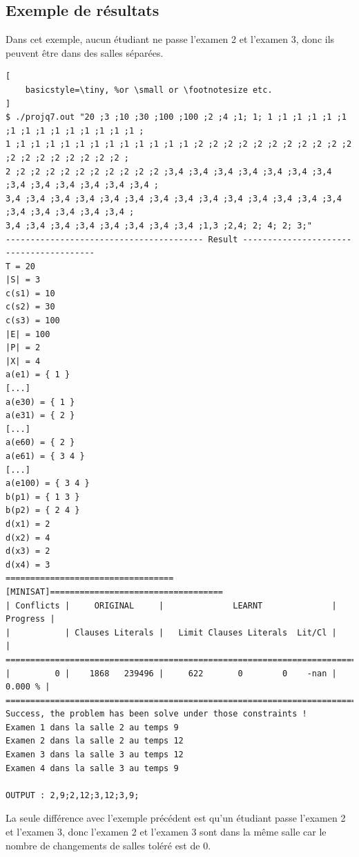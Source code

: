 \documentclass[a4paper,11pt]{article}
\begin{document}
\subsection{Exemple de résultats}
Dans cet exemple, aucun étudiant ne passe l'examen 2 et l'examen 3, donc ils peuvent être dans des salles séparées.
\begin{lstlisting}[
    basicstyle=\tiny, %or \small or \footnotesize etc.
]
$ ./projq7.out "20 ;3 ;10 ;30 ;100 ;100 ;2 ;4 ;1; 1; 1 ;1 ;1 ;1 ;1 ;1 ;1 ;1 ;1 ;1 ;1 ;1 ;1 ;1 ;1 ;
1 ;1 ;1 ;1 ;1 ;1 ;1 ;1 ;1 ;1 ;1 ;1 ;1 ;2 ;2 ;2 ;2 ;2 ;2 ;2 ;2 ;2 ;2 ;2 ;2 ;2 ;2 ;2 ;2 ;2 ;2 ;2 ;
2 ;2 ;2 ;2 ;2 ;2 ;2 ;2 ;2 ;2 ;2 ;3,4 ;3,4 ;3,4 ;3,4 ;3,4 ;3,4 ;3,4 ;3,4 ;3,4 ;3,4 ;3,4 ;3,4 ;3,4 ;
3,4 ;3,4 ;3,4 ;3,4 ;3,4 ;3,4 ;3,4 ;3,4 ;3,4 ;3,4 ;3,4 ;3,4 ;3,4 ;3,4 ;3,4 ;3,4 ;3,4 ;3,4 ;3,4 ;
3,4 ;3,4 ;3,4 ;3,4 ;3,4 ;3,4 ;3,4 ;3,4 ;1,3 ;2,4; 2; 4; 2; 3;"                                                                        
---------------------------------------- Result ----------------------------------------
T = 20
|S| = 3
c(s1) = 10
c(s2) = 30
c(s3) = 100
|E| = 100
|P| = 2
|X| = 4
a(e1) = { 1 }
[...]
a(e30) = { 1 }
a(e31) = { 2 }
[...]
a(e60) = { 2 }
a(e61) = { 3 4 }
[...]
a(e100) = { 3 4 }
b(p1) = { 1 3 }
b(p2) = { 2 4 }
d(x1) = 2
d(x2) = 4
d(x3) = 2
d(x4) = 3
==================================[MINISAT]===================================
| Conflicts |     ORIGINAL     |              LEARNT              | Progress |
|           | Clauses Literals |   Limit Clauses Literals  Lit/Cl |          |
==============================================================================
|         0 |    1868   239496 |     622       0        0    -nan |  0.000 % |
==============================================================================
Success, the problem has been solve under those constraints !
Examen 1 dans la salle 2 au temps 9
Examen 2 dans la salle 2 au temps 12
Examen 3 dans la salle 3 au temps 12
Examen 4 dans la salle 3 au temps 9

OUTPUT : 2,9;2,12;3,12;3,9;

\end{lstlisting}
La seule différence avec l'exemple précédent est qu'un étudiant passe l'examen 2 et l'examen 3, donc l'examen 2 et l'examen 3 sont dans la même salle car le nombre de changements de salles toléré est de 0.
\end{document}
